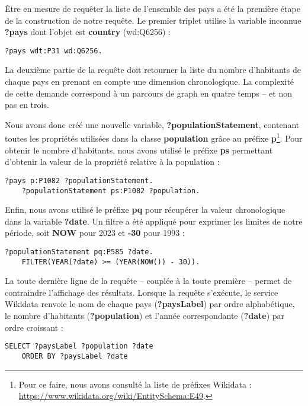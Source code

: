 \documentclass[hidelinks, 12pt]{article}
\begin{document}
		Être en mesure de requêter la liste de l'ensemble des pays a été la première étape de la construction de notre requête. Le premier triplet utilise la variable inconnue \textbf{?pays} dont l'objet est \textbf{country} (wd:Q6256) :
		
\begin{lstlisting}[language=SPARQL]
	?pays wdt:P31 wd:Q6256.
\end{lstlisting}
		
		La deuxième partie de la requête doit retourner la liste du nombre d'habitants de chaque pays en prenant en compte une dimension chronologique. La complexité de cette demande correspond à un parcours de graph en quatre temps -- et non pas en trois.
		
		Nous avons donc créé une nouvelle variable, \textbf{?populationStatement}, contenant toutes les propriétés utilisées dans la classe \textbf{population} grâce au préfixe \textbf{p}\footnote{Pour ce faire, nous avons consulté la liste de préfixes Wikidata : \url{https://www.wikidata.org/wiki/EntitySchema:E49}.}. Pour obtenir le nombre d'habitants, nous avons utilisé le préfixe \textbf{ps} permettant d'obtenir la valeur de la propriété relative à la population :
		
\begin{lstlisting}[language=SPARQL]
	?pays p:P1082 ?populationStatement.
	?populationStatement ps:P1082 ?population.
\end{lstlisting}
		
		Enfin, nous avons utilisé le préfixe \textbf{pq} pour récupérer la valeur chronologique dans la variable \textbf{?date}. Un filtre a été appliqué pour exprimer les limites de notre période, soit \textbf{NOW} pour 2023 et \textbf{-30} pour 1993 :
		
\begin{lstlisting}[language=SPARQL]
	?populationStatement pq:P585 ?date.
	FILTER(YEAR(?date) >= (YEAR(NOW()) - 30)).
\end{lstlisting}
		
		La toute dernière ligne de la requête -- couplée à la toute première -- permet de contraindre l'affichage des résultats. Lorsque la requête s'exécute, le service Wikidata renvoie le nom de chaque pays (\textbf{?paysLabel}) par ordre alphabétique, le nombre d'habitants (\textbf{?population}) et l'année correspondante (\textbf{?date}) par ordre croissant :
		
\begin{lstlisting}[language=SPARQL]
	SELECT ?paysLabel ?population ?date
	ORDER BY ?paysLabel ?date
\end{lstlisting}
		
\end{document}
